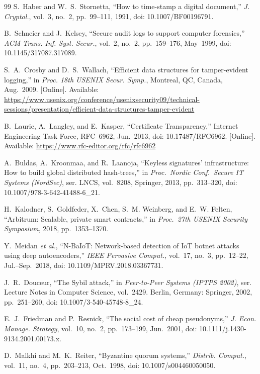 \documentclass{ieeeaccess}
\begin{document}
\begin{thebibliography}{99}
 S.~Haber and W.~S.~Stornetta, ``How to time-stamp a digital document,'' \emph{J. Cryptol.}, vol.~3, no.~2, pp.~99--111, 1991, doi: 10.1007/BF00196791.

 B.~Schneier and J.~Kelsey, ``Secure audit logs to support computer forensics,'' \emph{ACM Trans. Inf. Syst. Secur.}, vol.~2, no.~2, pp.~159--176, May~1999, doi: 10.1145/317087.317089.

 S.~A.~Crosby and D.~S.~Wallach, ``Efficient data structures for tamper-evident logging,'' in \emph{Proc. 18th USENIX Secur. Symp.}, Montreal, QC, Canada, Aug.~2009. [Online]. Available: \url{https://www.usenix.org/conference/usenixsecurity09/technical-sessions/presentation/efficient-data-structures-tamper-evident}

 B.~Laurie, A.~Langley, and E.~Kasper, ``Certificate Transparency,'' Internet Engineering Task Force, RFC~6962, Jun.~2013, doi: 10.17487/RFC6962. [Online]. Available: \url{https://www.rfc-editor.org/rfc/rfc6962}

A.~Buldas, A.~Kroonmaa, and R.~Laanoja,
``Keyless signatures' infrastructure: How to build global
distributed hash-trees,''
in \textit{Proc.\ Nordic Conf.\ Secure IT Systems (NordSec)},
ser. LNCS, vol.~8208, Springer, 2013, pp.~313--320,
doi: 10.1007/978-3-642-41488-6\_21.

H.~Kalodner, S.~Goldfeder, X.~Chen, S.~M. Weinberg, and E.~W. Felten,
``Arbitrum: Scalable, private smart contracts,''
in \textit{Proc.\ 27th USENIX Security Symposium},
2018, pp.~1353--1370.

Y.~Meidan \textit{et al.},
``N-BaIoT: Network-based detection of IoT botnet attacks using deep
autoencoders,''
\textit{IEEE Pervasive Comput.}, vol.~17, no.~3, pp.~12--22, Jul.--Sep.~2018,
doi: 10.1109/MPRV.2018.03367731.

 J.~R.~Douceur, ``The Sybil attack,'' in \emph{Peer-to-Peer Systems (IPTPS 2002)}, ser. Lecture Notes in Computer Science, vol.~2429. Berlin, Germany: Springer, 2002, pp.~251--260, doi: 10.1007/3-540-45748-8\_24.

 E.~J.~Friedman and P.~Resnick, ``The social cost of cheap pseudonyms,'' \emph{J. Econ. Manage. Strategy}, vol.~10, no.~2, pp.~173--199, Jun.~2001, doi: 10.1111/j.1430-9134.2001.00173.x.

 D.~Malkhi and M.~K.~Reiter, ``Byzantine quorum systems,'' \emph{Distrib. Comput.}, vol.~11, no.~4, pp.~203--213, Oct.~1998, doi: 10.1007/s004460050050.


\end{thebibliography}
\end{document}
